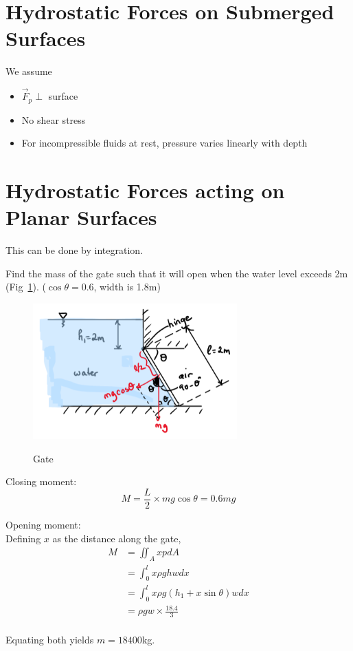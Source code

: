 \documentclass[12pt]{article}
\begin{document}
\section{Hydrostatic Forces on Submerged Surfaces}

We assume

\begin{itemize}
	\item $\vec{F}_p \perp$ surface
	\item No shear stress
	\item For incompressible fluids at rest, pressure varies linearly with depth
\end{itemize}

\section{Hydrostatic Forces acting on Planar Surfaces}

This can be done by integration.

\begin{ex}
	Find the mass of the gate such that it will open when the water level exceeds 2m (Fig~\ref{gate}). ($\cos\theta=0.6$, width is 1.8m)

	\begin{figure}
		\centering
		\includegraphics[width=0.7\textwidth]{gate.png}
		\label{gate}
		\caption{Gate}
	\end{figure}

Closing moment:
$$M = \frac{L}{2} \times mg\cos\theta = 0.6mg$$

Opening moment: \\
Defining $x$ as the distance along the gate,
\begin{align*}
	M &= \iint_A xpdA \\
	  &= \int_0^l x\rho ghw dx \\
	  &= \int_0^l x\rho g(h_1+x\sin\theta)w dx \\
	  &= \rho gw \times \frac{18.4}{3} \\
\end{align*}

Equating both yields $m=18400$kg.
\end{ex}
\end{document}
